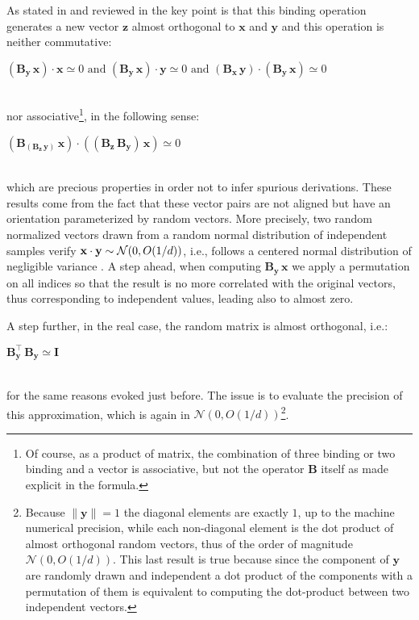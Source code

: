 \documentclass[sn-mathphys]{sn-jnl}
\newcommand{\eqline}[1]{~\vspace{0.1cm}\\\centerline{$#1$}\vspace{0.1cm}\\}
\begin{document}
\begin{appendices}
As stated in \cite{gosmann_vector-derived_2019} and reviewed in \cite{mercier_ontology_2021} the key point is that this binding operation generates a new vector $\mathbf{z}$ almost orthogonal to $\mathbf{x}$ and $\mathbf{y}$ and this operation is neither commutative:
\eqline{(\mathbf{B_y} \, \mathbf{x}) \cdot \mathbf{x} \simeq 0 \mbox{ and } (\mathbf{B_y} \, \mathbf{x}) \cdot \mathbf{y} \simeq 0 \mbox{ and } (\mathbf{B_x} \, \mathbf{y}) \cdot (\mathbf{B_y} \, \mathbf{x}) \simeq 0}
nor associative\footnote{Of course, as a product of matrix, the combination of three binding or two binding and a vector is associative, but not the operator $\mathbf{B}$ itself as made explicit in the formula.}, in the following sense:
\eqline{(\mathbf{B_{(B_z \, y)}} \, \mathbf{x}) \cdot ((\mathbf{B_z} \, \mathbf{B_y}) \, \mathbf{x}) \simeq 0}
which are precious properties in order not to infer spurious derivations. These results come from the fact that these vector pairs are not aligned but have an orientation parameterized by random vectors. More precisely, two random normalized vectors drawn from a random normal distribution of independent samples verify ${\bf x} \cdot {\bf y} \sim {\mathcal N}(0, O(1/d))$, i.e., follows a centered normal distribution of negligible variance \cite{schlegel_comparison_2020}. A step ahead, when computing $\mathbf{B_y} \, \mathbf{x}$ we apply a permutation on all indices so that the result is no more correlated with the original vectors, thus corresponding to independent values, leading also to almost zero.

A step further, in the real case, the random matrix is almost orthogonal, i.e.:
\eqline{\mathbf{B_y^\top} \, \mathbf{B_y} \simeq \mathbf{I}}
for the same reasons evoked just before. The issue is to evaluate the precision of this approximation, which is again in ${\mathcal N}(0, O(1/d))$\footnote{Because $\|\mathbf{y}\|=1$ the diagonal elements are exactly $1$, up to the machine numerical precision, while each non-diagonal element is the dot product of almost orthogonal random vectors, thus of the order of magnitude ${\mathcal N}(0, O(1/d))$. This last result is true because since the component of $\mathbf{y}$ are randomly drawn and independent a dot product of the components with a permutation of them is equivalent to computing the dot-product between two independent vectors.}.


\end{appendices}
\end{document}
